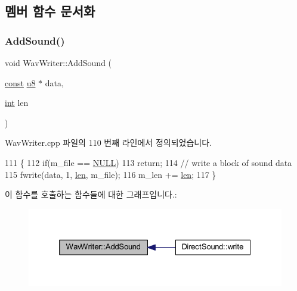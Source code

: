 \subsection{멤버 함수 문서화}
\mbox{\label{class_wav_writer_a2033f614c70ac3e59d07fb43ea26577a}} 
\subsubsection{\texorpdfstring{Add\+Sound()}{AddSound()}}
{\footnotesize\ttfamily void Wav\+Writer\+::\+Add\+Sound (\begin{DoxyParamCaption}\item[{\mbox{\hyperlink{getopt1_8c_a2c212835823e3c54a8ab6d95c652660e}{const}} \mbox{\hyperlink{_system_8h_aed742c436da53c1080638ce6ef7d13de}{u8}} $\ast$}]{data,  }\item[{\mbox{\hyperlink{_util_8cpp_a0ef32aa8672df19503a49fab2d0c8071}{int}}}]{len }\end{DoxyParamCaption})}



Wav\+Writer.\+cpp 파일의 110 번째 라인에서 정의되었습니다.


\begin{DoxyCode}
111 \{
112   \textcolor{keywordflow}{if}(m\_file == \mbox{\hyperlink{getopt1_8c_a070d2ce7b6bb7e5c05602aa8c308d0c4}{NULL}})
113     \textcolor{keywordflow}{return};
114   \textcolor{comment}{// write a block of sound data}
115   fwrite(data, 1, \mbox{\hyperlink{expr-lex_8cpp_afed088663f8704004425cdae2120b9b3}{len}}, m\_file);
116   m\_len += \mbox{\hyperlink{expr-lex_8cpp_afed088663f8704004425cdae2120b9b3}{len}};
117 \}
\end{DoxyCode}
이 함수를 호출하는 함수들에 대한 그래프입니다.\+:
\nopagebreak
\begin{figure}[H]
\begin{center}
\leavevmode
\includegraphics[width=325pt]{class_wav_writer_a2033f614c70ac3e59d07fb43ea26577a_icgraph}
\end{center}
\end{figure}
\mbox{\label{class_wav_writer_a18a057d0c1901caa6b08f528bd6908a7}} 
